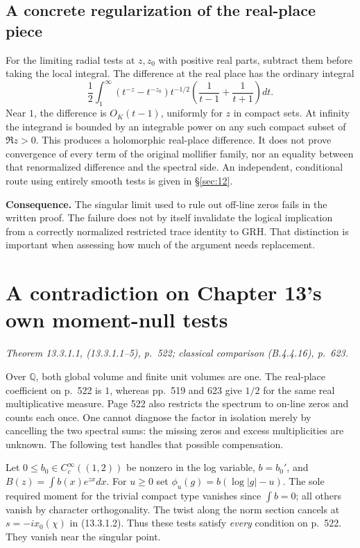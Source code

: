\documentclass[11pt,reqno]{amsart}
\numberwithin{equation}{section}
\newcommand{\Q}{\mathbb Q}\newcommand{\R}{\mathbb R}\newcommand{\C}{\mathbb C}\newcommand{\Z}{\mathbb Z}
\begin{document}
\subsection*{A concrete regularization of the real-place piece}
For the limiting radial tests at \(z,z_0\) with positive real parts, subtract them before taking the local integral. The difference at the real place has the ordinary integral
\[
 \frac12\int_1^\infty
 (t^{-z}-t^{-z_0})t^{-1/2}
 \left(\frac1{t-1}+\frac1{t+1}\right)dt .
\]
Near \(1\), the difference is \(O_K(t-1)\), uniformly for \(z\) in compact sets. At infinity the integrand is bounded by an integrable power on any such compact subset of \(\Re z>0\). This produces a holomorphic real-place difference. It does not prove convergence of every term of the original mollifier family, nor an equality between that renormalized difference and the spectral side. An independent, conditional route using entirely smooth tests is given in \S\ref{sec:12}.

\textbf{Consequence.} The singular limit used to rule out off-line zeros fails in the written proof. The failure does not by itself invalidate the logical implication from a correctly normalized restricted trace identity to GRH. That distinction is important when assessing how much of the argument needs replacement.


\section{A contradiction on Chapter 13's own moment-null tests}\label{sec:11}

\textit{Theorem 13.3.1.1, (13.3.1.1--5), p.~522; classical comparison (B.4.4.16), p.~623.}\par
Over \(\Q\), both global volume and finite unit volumes are one. The real-place coefficient on p.~522 is \(1\), whereas pp.~519 and 623 give \(1/2\) for the same real multiplicative measure. Page 522 also restricts the spectrum to on-line zeros and counts each once. One cannot diagnose the factor in isolation merely by cancelling the two spectral sums: the missing zeros and excess multiplicities are unknown. The following test handles that possible compensation.

Let \(0\le b_0\in C_c^\infty((1,2))\) be nonzero in the log variable, \(b=b_0'\), and \(B(z)=\int b(x)e^{zx}dx\). For \(u\ge0\) set \(\phi_u(g)=b(\log|g|-u)\). The sole required moment for the trivial compact type vanishes since \(\int b=0\); all others vanish by character orthogonality. The twist along the norm section cancels at \(s=-ix_0(\chi)\) in (13.3.1.2). Thus these tests satisfy \emph{every} condition on p.~522. They vanish near the singular point.
\end{document}
